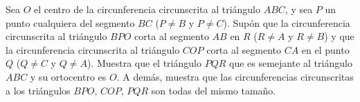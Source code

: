 Sea $O$ el centro de la circunferencia circunscrita al triángulo $ABC$, y sea $P$ un punto cualquiera del segmento $BC$ ($P\neq B$ y $P\neq C$). Supón que la circunferencia circunscrita al triángulo $BPO$ corta al segmento $AB$ en $R$ ($R\neq A$ y $R\neq B$) y que la circunferencia circunscrita al triángulo $COP$ corta al segmento $CA$ en el punto $Q$ ($Q\neq C$ y $Q\neq A$). Muestra que el triángulo $PQR$ que es semejante al triángulo $ABC$ y su ortocentro es $O$. A demás, muestra que las circunferencias circunscritas a los triángulos $BPO$, $COP$, $PQR$ son todas del mismo tamaño.
